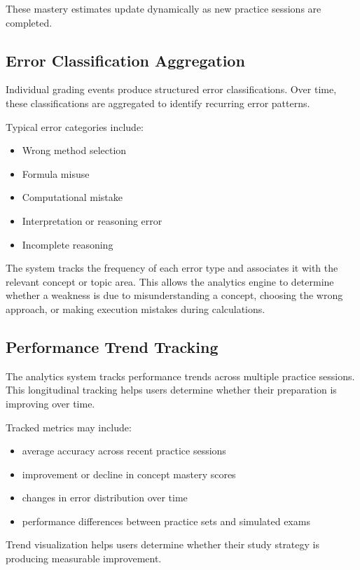 \documentclass[11pt]{article}
\begin{document}
These mastery estimates update dynamically as new practice sessions are completed.

\subsection{Error Classification Aggregation}
Individual grading events produce structured error classifications. Over time, these classifications are aggregated to identify recurring error patterns.

Typical error categories include:

\begin{itemize}
\item Wrong method selection
\item Formula misuse
\item Computational mistake
\item Interpretation or reasoning error
\item Incomplete reasoning
\end{itemize}

The system tracks the frequency of each error type and associates it with the relevant concept or topic area. This allows the analytics engine to determine whether a weakness is due to misunderstanding a concept, choosing the wrong approach, or making execution mistakes during calculations.

\subsection{Performance Trend Tracking}
The analytics system tracks performance trends across multiple practice sessions. This longitudinal tracking helps users determine whether their preparation is improving over time.

Tracked metrics may include:

\begin{itemize}
\item average accuracy across recent practice sessions
\item improvement or decline in concept mastery scores
\item changes in error distribution over time
\item performance differences between practice sets and simulated exams
\end{itemize}

Trend visualization helps users determine whether their study strategy is producing measurable improvement.
\end{document}
